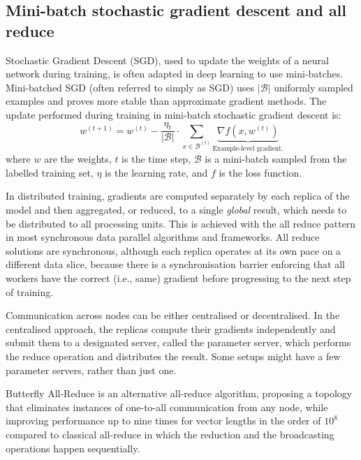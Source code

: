 \documentclass{article}
\begin{document}
\subsection{Mini-batch stochastic gradient descent and all reduce}
Stochastic Gradient Descent (SGD), used to update the weights of a neural network during training, is often adapted in deep learning to use mini-batches. Mini-batched SGD (often referred to simply as SGD) uses $\vert \mathcal{B} \vert$ uniformly sampled examples and proves more stable than approximate gradient methods. The update performed during training in mini-batch stochastic gradient descent is:
\begin{equation}
w^{(t + 1)}=w^{(t)}- \frac{\eta_t}{\vert \mathcal{B} \vert} \cdot \sum_{x \in \mathcal{B}^{(t)}} \underbrace{\nabla f\left(x, w^{(t)}\right)}_\text{Example-level gradient.}
\end{equation}
where $w$ are the weights, $t$ is the time step, $\mathcal{B}$ is a mini-batch sampled from the labelled training set, $\eta$ is the learning rate, and $f$ is the loss function.

In distributed training, gradients are computed separately by each replica of the model and then aggregated, or reduced, to a single \textit{global} result, which needs to be distributed to all processing units. This is achieved with the all reduce pattern in most synchronous data parallel algorithms and frameworks. All reduce solutions are synchronous, although each replica operates at its own pace on a different data slice, because there is a synchronisation barrier enforcing that all workers have the correct (i.e., same) gradient before progressing to the next step of training.

Communication across nodes can be either centralised or decentralised. In the centralised approach, the replicas compute their gradients independently and submit them to a designated server, called the parameter server, which performs the reduce operation and distributes the result. Some setups might have a few parameter servers, rather than just one. %

Butterfly All-Reduce is an alternative all-reduce algorithm, proposing a topology that eliminates instances of one-to-all communication from any node, while improving performance up to nine times for vector lengths in the order of $10^8$ \citep{li2017efficient} compared to classical all-reduce in which the reduction and the broadcasting operations happen sequentially.
\end{document}
